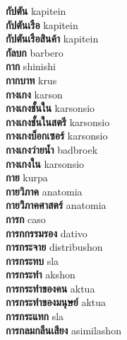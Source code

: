 \textbf{ กัปตัน  } kapitein \\
\textbf{ กัปตันเรือ  } kapitein \\
\textbf{ กัปตันเรือสินค้า  } kapitein \\
\textbf{ กัลบก  } barbero \\
\textbf{ กาก  } shinishi \\
\textbf{ กากบาท  } krus \\
\textbf{ กางเกง  } karson \\
\textbf{ กางเกงชั้นใน  } karsonsio \\
\textbf{ กางเกงชั้นในสตรี  } karsonsio \\
\textbf{ กางเกงบ็อกเซอร์  } karsonsio \\
\textbf{ กางเกงว่ายน้ำ  } badbroek \\
\textbf{ กางเกงใน  } karsonsio \\
\textbf{ กาย  } kurpa \\
\textbf{ กายวิภาค  } anatomia \\
\textbf{ กายวิิภาคศาสตร์  } anatomia \\
\textbf{ การก  } caso \\
\textbf{ การกกรรมรอง  } dativo \\
\textbf{ การกระจาย  } distribushon \\
\textbf{ การกระทบ  } sla \\
\textbf{ การกระทำ  } akshon \\
\textbf{ การกระทำของคน  } aktua \\
\textbf{ การกระทำของมนุษย์  } aktua \\
\textbf{ การกระแทก  } sla \\
\textbf{ การกลมกลืนเสียง  } asimilashon \\

